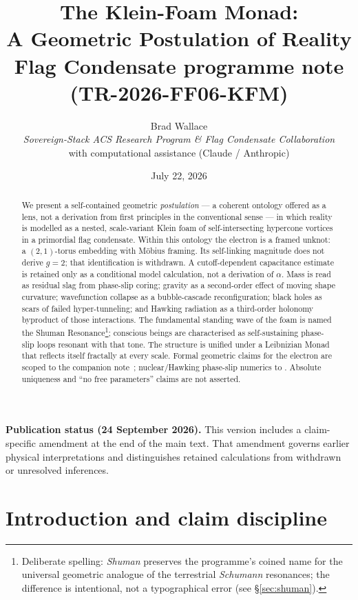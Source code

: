 \documentclass[11pt,a4paper]{article}
\title{\textbf{The Klein-Foam Monad:\\
A Geometric Postulation of Reality}\\[0.35em]
\large Flag Condensate programme note (TR-2026-FF06-KFM)}
\author{Brad Wallace\\
\small\textit{Sovereign-Stack ACS Research Program \& Flag Condensate Collaboration}\\
\small with computational assistance (Claude / Anthropic)}
\date{July 22, 2026}
\theoremstyle{definition}
\theoremstyle{remark}
\begin{document}
\maketitle

\begin{abstract}
We present a self-contained geometric \emph{postulation} --- a coherent
ontology offered as a lens, not a derivation from first principles in the
conventional sense --- in which reality is modelled as a nested,
scale-variant Klein foam of self-intersecting hypercone vortices in a
primordial flag condensate.  Within this ontology the electron is a
framed unknot: a $(2,1)$-torus embedding with M\"obius framing.
Its self-linking magnitude does not derive $g=2$; that identification is
withdrawn. A cutoff-dependent capacitance estimate is retained only as
a conditional model calculation, not a derivation of $\alpha$.  Mass is read
as residual slag from phase-slip coring; gravity as a second-order effect
of moving shape curvature; wavefunction collapse as a bubble-cascade
reconfiguration; black holes as scars of failed hyper-tunneling; and
Hawking radiation as a third-order holonomy byproduct of those
interactions.  The fundamental standing wave of the foam is named the
Shuman Resonance\footnote{Deliberate spelling: \emph{Shuman} preserves
the programme's coined name for the universal geometric analogue of the
terrestrial \emph{Schumann} resonances; the difference is intentional,
not a typographical error (see \S\ref{sec:shuman}).}; conscious beings
are characterised as self-sustaining
phase-slip loops resonant with that tone.  The structure is unified
under a Leibnizian Monad that reflects itself fractally at every scale.
Formal geometric claims for the electron are scoped to the companion
note~\cite{Mobius2026}; nuclear/Hawking phase-slip numerics to
\cite{FlagDecay2026}.  Absolute uniqueness and ``no free parameters''
claims are not asserted.
\end{abstract}
\par\smallskip\noindent\textbf{Publication status (24 September 2026).}
This version includes a claim-specific amendment at the end of the main text.
That amendment governs earlier physical interpretations and distinguishes
retained calculations from withdrawn or unresolved inferences.\par\smallskip


\tableofcontents
\newpage

\section{Introduction and claim discipline}
\label{sec:intro}
\end{document}
